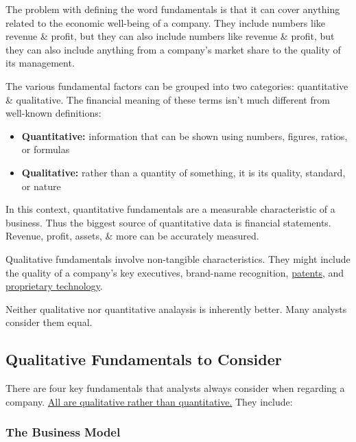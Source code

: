 \documentclass{article}
\begin{document}
	The problem with defining the word fundamentals is that it can cover anything related to the economic well-being of a company. They include numbers like revenue \& profit, but they can also 
	include numbers like revenue \& profit, but they can also include anything from a company's market share to the quality of its management. \newline

	The various fundamental factors can be grouped into two categories: quantitative \& qualitative. The financial meaning of these terms isn't much different from well-known definitions: \newline

	\begin{itemize}
		\item {\bf Quantitative:} information that can be shown using numbers, figures, ratios, or formulas
		\item {\bf Qualitative:} rather than a quantity of something, it is its quality, standard, or nature
	\end{itemize}

	In this context, quantitative fundamentals are a measurable characteristic of a business. Thus the biggest source of quantitative data is financial statements. Revenue, profit, assets, \& more
	can be accurately measured. \newline

	Qualitative fundamentals involve non-tangible characteristics. They might include the quality of a company's key executives, brand-name recognition, \href{https://www.investopedia.com/terms/p/patent.asp}{patents},
	and \href{https://www.investopedia.com/terms/p/proprietarytechnology.asp}{proprietary technology}. \newline

	Neither qualitative nor quantitative analaysis is inherently better. Many analysts consider them equal. \newline

	\subsection{Qualitative Fundamentals to Consider}

	There are four key fundamentals that analysts always consider when regarding a company. \underline{All are qualitative rather than quantitative.} They include:

	\subsubsection{The Business Model}
\end{document}
